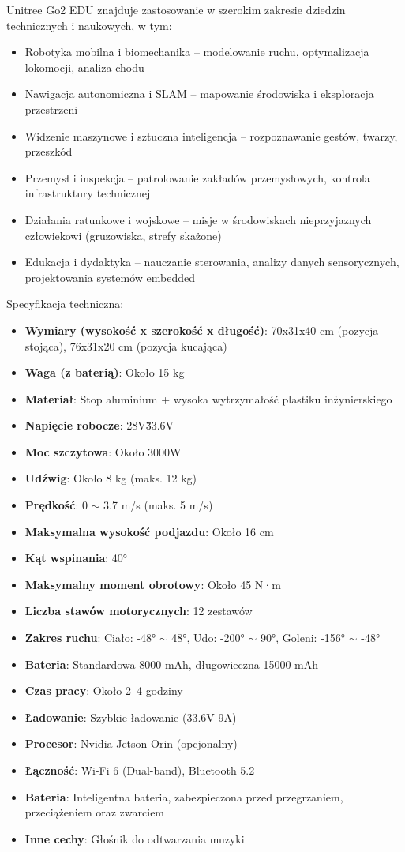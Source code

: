\documentclass[12pt]{article}
\begin{document}
Unitree Go2 EDU znajduje zastosowanie w szerokim zakresie dziedzin technicznych i naukowych, w tym:
\begin{itemize}
    \item Robotyka mobilna i biomechanika – modelowanie ruchu, optymalizacja lokomocji, analiza chodu
    \item Nawigacja autonomiczna i SLAM – mapowanie środowiska i eksploracja przestrzeni
    \item Widzenie maszynowe i sztuczna inteligencja – rozpoznawanie gestów, twarzy, przeszkód
    \item Przemysł i inspekcja – patrolowanie zakładów przemysłowych, kontrola infrastruktury technicznej
    \item Działania ratunkowe i wojskowe – misje w środowiskach nieprzyjaznych człowiekowi (gruzowiska, strefy skażone)
    \item Edukacja i dydaktyka – nauczanie sterowania, analizy danych sensorycznych, projektowania systemów embedded
\end{itemize}


Specyfikacja techniczna:
\begin{itemize}
    \item \textbf{Wymiary (wysokość x szerokość x długość)}: 70x31x40 cm (pozycja stojąca), 76x31x20 cm (pozycja kucająca)
    \item \textbf{Waga (z baterią)}: Około 15 kg
    \item \textbf{Materiał}: Stop aluminium + wysoka wytrzymałość plastiku inżynierskiego
    \item \textbf{Napięcie robocze}: 28V\~33.6V
    \item \textbf{Moc szczytowa}: Około 3000W
    \item \textbf{Udźwig}: Około 8 kg (maks. 12 kg)
    \item \textbf{Prędkość}: 0 $\sim$ 3.7 m/s (maks. 5 m/s)
    \item \textbf{Maksymalna wysokość podjazdu}: Około 16 cm
    \item \textbf{Kąt wspinania}: 40°
    \item \textbf{Maksymalny moment obrotowy}: Około 45 N·m
    \item \textbf{Liczba stawów motorycznych}: 12 zestawów
    \item \textbf{Zakres ruchu}: Ciało: -48° $\sim$ 48°, Udo: -200° $\sim$ 90°, Goleni: -156° $\sim$ -48°
    \item \textbf{Bateria}: Standardowa 8000 mAh, długowieczna 15000 mAh
    \item \textbf{Czas pracy}: Około 2–4 godziny
    \item \textbf{Ładowanie}: Szybkie ładowanie (33.6V 9A)
    \item \textbf{Procesor}: Nvidia Jetson Orin (opcjonalny)
    \item \textbf{Łączność}: Wi-Fi 6 (Dual-band), Bluetooth 5.2
    \item \textbf{Bateria}: Inteligentna bateria, zabezpieczona przed przegrzaniem, przeciążeniem oraz zwarciem
    \item \textbf{Inne cechy}: Głośnik do odtwarzania muzyki
\end{itemize}
\end{document}
